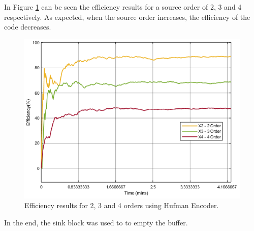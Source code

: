 \begin{refsection}
In Figure \ref{f:efficiencygraph} can be seen the efficiency results for a source order of 2, 3 and 4 respectively. As expected, when the source order increases, the efficiency of the code decreases.

\begin{figure}[!h]
\centering
\includegraphics[width=4.5in]{./sdf/eit_45550_estimator_source_code_efficiency/figures/efficiencygraph.png}
\caption[Efficiency results for 2, 3 and 4 orders using Hufman Encoder.]{Efficiency results for 2, 3 and 4 orders using Hufman Encoder.}
\label{f:efficiencygraph}
\end{figure}

In the end, the sink block was used to to empty the buffer.


\end{refsection}
